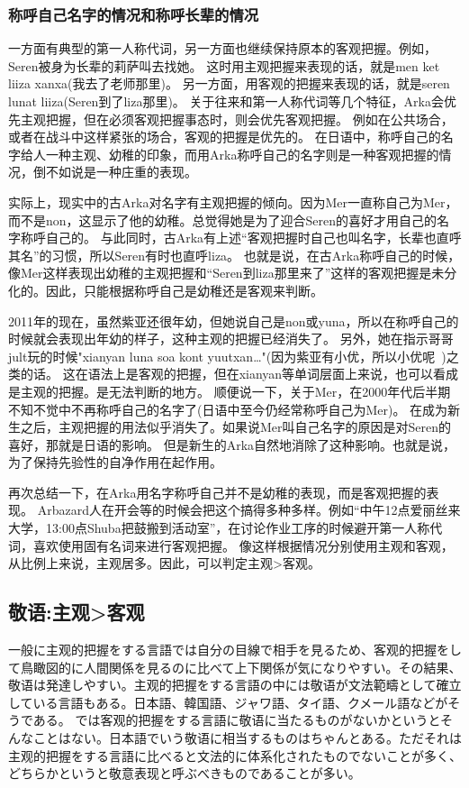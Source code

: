 \subsubsection{称呼自己名字的情况和称呼长辈的情况}

一方面有典型的第一人称代词，另一方面也继续保持原本的客观把握。例如，Seren被身为长辈的莉萨叫去找她。
这时用主观把握来表现的话，就是men ket liiza xanxa(我去了老师那里)。
另一方面，用客观的把握来表现的话，就是seren lunat liiza(Seren到了liza那里)。
关于往来和第一人称代词等几个特征，Arka会优先主观把握，但在必须客观把握事态时，则会优先客观把握。
例如在公共场合，或者在战斗中这样紧张的场合，客观的把握是优先的。
在日语中，称呼自己的名字给人一种主观、幼稚的印象，而用Arka称呼自己的名字则是一种客观把握的情况，倒不如说是一种庄重的表现。

实际上，现实中的古Arka对名字有主观把握的倾向。因为Mer一直称自己为Mer，而不是non，这显示了他的幼稚。总觉得她是为了迎合Seren的喜好才用自己的名字称呼自己的。
与此同时，古Arka有上述“客观把握时自己也叫名字，长辈也直呼其名”的习惯，所以Seren有时也直呼liza。
也就是说，在古Arka称呼自己的时候，像Mer这样表现出幼稚的主观把握和“Seren到liza那里来了”这样的客观把握是未分化的。因此，只能根据称呼自己是幼稚还是客观来判断。

2011年的现在，虽然紫亚还很年幼，但她说自己是non或yuna，所以在称呼自己的时候就会表现出年幼的样子，这种主观的把握已经消失了。
另外，她在指示哥哥jult玩的时候"xianyan luna soa kont yuutxan…"(因为紫亚有小优，所以小优呢~)之类的话。
这在语法上是客观的把握，但在xianyan等单词层面上来说，也可以看成是主观的把握。是无法判断的地方。
顺便说一下，关于Mer，在2000年代后半期不知不觉中不再称呼自己的名字了(日语中至今仍经常称呼自己为Mer)。
在成为新生之后，主观把握的用法似乎消失了。如果说Mer叫自己名字的原因是对Seren的喜好，那就是日语的影响。
但是新生的Arka自然地消除了这种影响。也就是说，为了保持先验性的自净作用在起作用。

再次总结一下，在Arka用名字称呼自己并不是幼稚的表现，而是客观把握的表现。
Arbazard人在开会等的时候会把这个搞得多种多样。例如“中午12点爱丽丝来大学，13:00点Shuba把鼓搬到活动室”，在讨论作业工序的时候避开第一人称代词，喜欢使用固有名词来进行客观把握。
像这样根据情况分别使用主观和客观，从比例上来说，主观居多。因此，可以判定主观>客观。

\subsection{敬语:主观>客观}

一般に主观的把握をする言語では自分の目線で相手を見るため、客观的把握をして鳥瞰図的に人間関係を見るのに比べて上下関係が気になりやすい。その結果、敬语は発達しやすい。主观的把握をする言語の中には敬语が文法範疇として確立している言語もある。日本語、韓国語、ジャワ語、タイ語、クメール語などがそうである。
では客观的把握をする言語に敬语に当たるものがないかというとそんなことはない。日本語でいう敬语に相当するものはちゃんとある。ただそれは主观的把握をする言語に比べると文法的に体系化されたものでないことが多く、どちらかというと敬意表现と呼ぶべきものであることが多い。

